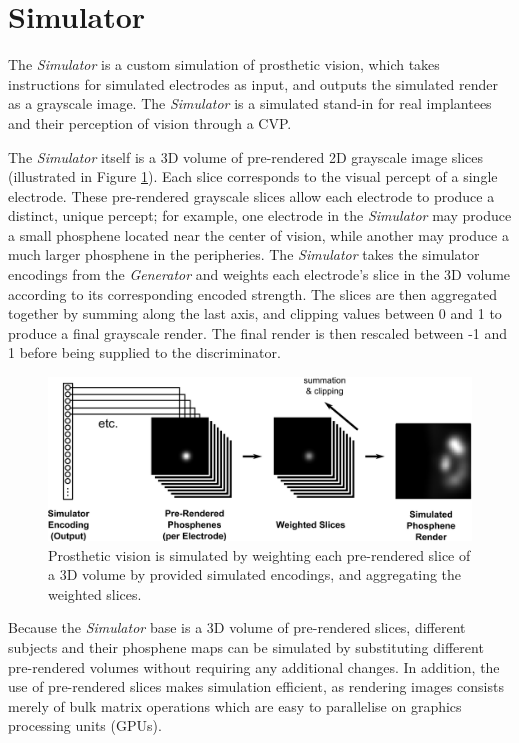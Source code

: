\documentclass[a4paper,11pt,openany]{book}
\begin{document}
\section*{Simulator}
\label{sec:orgd940782}

The \emph{Simulator} is a custom simulation of prosthetic vision, which takes instructions for simulated electrodes as input, and outputs the simulated render as a grayscale image.
The \emph{Simulator} is a simulated stand-in for real implantees and their perception of vision through a CVP.

The \emph{Simulator} itself is a 3D volume of pre-rendered 2D grayscale image slices (illustrated in Figure \ref{org4d2b31b}).
Each slice corresponds to the visual percept of a single electrode.
These pre-rendered grayscale slices allow each electrode to produce a distinct, unique percept; for example, one electrode in the \emph{Simulator} may produce a small phosphene located near the center of vision, while another may produce a much larger phosphene in the peripheries.
The \emph{Simulator} takes the simulator encodings from the \emph{Generator} and weights each electrode's slice in the 3D volume according to its corresponding encoded strength.
The slices are then aggregated together by summing along the last axis, and clipping values between 0 and 1 to produce a final grayscale render.
The final render is then rescaled between -1 and 1 before being supplied to the discriminator.

\begin{figure}
\begin{center}
\includegraphics[width=.9\linewidth]{./images/methods_simulator.png}
\end{center}
\caption[Illustration of the phosphene simulation process]{\label{org4d2b31b}
Prosthetic vision is simulated by weighting each pre-rendered slice of a 3D volume by provided simulated encodings, and aggregating the weighted slices.}
\end{figure}

Because the \emph{Simulator} base is a 3D volume of pre-rendered slices, different subjects and their phosphene maps can be simulated by substituting different pre-rendered volumes without requiring any additional changes.
In addition, the use of pre-rendered slices makes simulation efficient, as rendering images consists merely of bulk matrix operations which are easy to parallelise on graphics processing units (GPUs).
\end{document}
